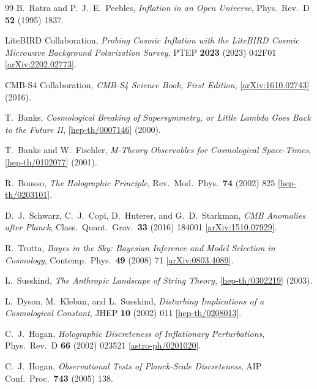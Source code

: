 \documentclass[a4paper,11pt]{article}
\begin{document}
\begin{thebibliography}{99}
B.~Ratra and P.~J.~E.~Peebles,
\textit{Inflation in an Open Universe},
Phys.\ Rev.\ D \textbf{52} (1995) 1837.

LiteBIRD Collaboration,
\textit{Probing Cosmic Inflation with the LiteBIRD Cosmic Microwave Background Polarization Survey},
PTEP \textbf{2023} (2023) 042F01
[\href{https://arxiv.org/abs/2202.02773}{arXiv:2202.02773}].

CMB-S4 Collaboration,
\textit{CMB-S4 Science Book, First Edition},
[\href{https://arxiv.org/abs/1610.02743}{arXiv:1610.02743}] (2016).

T.~Banks,
\textit{Cosmological Breaking of Supersymmetry, or Little Lambda Goes Back to the Future II},
[\href{https://arxiv.org/abs/hep-th/0007146}{hep-th/0007146}] (2000).

T.~Banks and W.~Fischler,
\textit{M-Theory Observables for Cosmological Space-Times},
[\href{https://arxiv.org/abs/hep-th/0102077}{hep-th/0102077}] (2001).

R.~Bousso,
\textit{The Holographic Principle},
Rev.\ Mod.\ Phys.\ \textbf{74} (2002) 825
[\href{https://arxiv.org/abs/hep-th/0203101}{hep-th/0203101}].

D.~J.~Schwarz, C.~J.~Copi, D.~Huterer, and G.~D.~Starkman,
\textit{CMB Anomalies after Planck},
Class.\ Quant.\ Grav.\ \textbf{33} (2016) 184001
[\href{https://arxiv.org/abs/1510.07929}{arXiv:1510.07929}].

R.~Trotta,
\textit{Bayes in the Sky: Bayesian Inference and Model Selection in Cosmology},
Contemp.\ Phys.\ \textbf{49} (2008) 71
[\href{https://arxiv.org/abs/0803.4089}{arXiv:0803.4089}].

L.~Susskind,
\textit{The Anthropic Landscape of String Theory},
[\href{https://arxiv.org/abs/hep-th/0302219}{hep-th/0302219}] (2003).

L.~Dyson, M.~Kleban, and L.~Susskind,
\textit{Disturbing Implications of a Cosmological Constant},
JHEP \textbf{10} (2002) 011
[\href{https://arxiv.org/abs/hep-th/0208013}{hep-th/0208013}].

C.~J.~Hogan,
\textit{Holographic Discreteness of Inflationary Perturbations},
Phys.\ Rev.\ D \textbf{66} (2002) 023521
[\href{https://arxiv.org/abs/astro-ph/0201020}{astro-ph/0201020}].

C.~J.~Hogan,
\textit{Observational Tests of Planck-Scale Discreteness},
AIP Conf.\ Proc.\ \textbf{743} (2005) 138.


\end{thebibliography}
\end{document}
